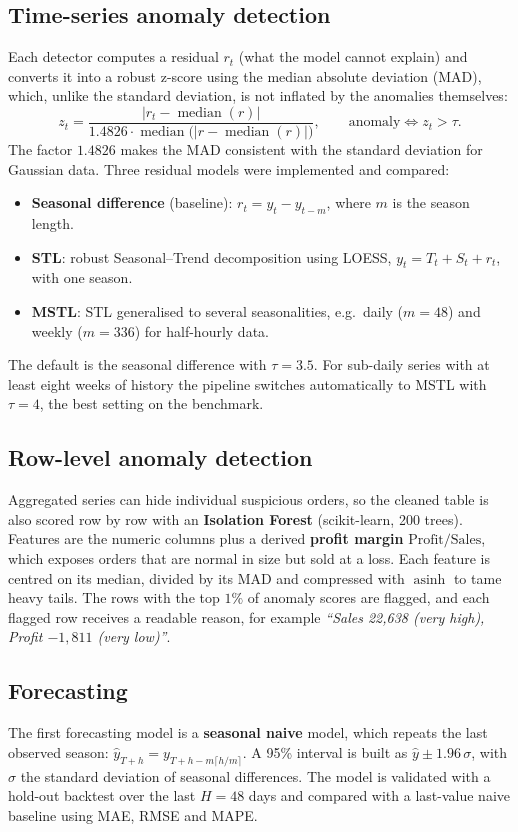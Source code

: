 \documentclass[11pt,a4paper]{article}
\begin{document}
\subsection{Time-series anomaly detection}
Each detector computes a residual $r_t$ (what the model cannot explain) and converts it into a robust z-score
using the median absolute deviation (MAD), which, unlike the standard deviation, is not inflated by the
anomalies themselves:
\[
  z_t = \frac{\lvert r_t - \operatorname{median}(r) \rvert}{1.4826\cdot \operatorname{median}\bigl(\lvert r - \operatorname{median}(r)\rvert\bigr)},
  \qquad \text{anomaly} \iff z_t > \tau .
\]
The factor $1.4826$ makes the MAD consistent with the standard deviation for Gaussian data. Three residual
models were implemented and compared:
\begin{itemize}
  \item \textbf{Seasonal difference} (baseline): $r_t = y_t - y_{t-m}$, where $m$ is the season length.
  \item \textbf{STL}: robust Seasonal--Trend decomposition using LOESS, $y_t = T_t + S_t + r_t$, with one season.
  \item \textbf{MSTL}: STL generalised to several seasonalities, e.g.\ daily ($m=48$) and weekly ($m=336$) for
        half-hourly data.
\end{itemize}
The default is the seasonal difference with $\tau = 3.5$. For sub-daily series with at least eight weeks of
history the pipeline switches automatically to MSTL with $\tau = 4$, the best setting on the benchmark.

\subsection{Row-level anomaly detection}
Aggregated series can hide individual suspicious orders, so the cleaned table is also scored row by row with an
\textbf{Isolation Forest} (scikit-learn, 200 trees). Features are the numeric columns plus a derived
\textbf{profit margin} $\text{Profit}/\text{Sales}$, which exposes orders that are normal in size but sold at a
loss. Each feature is centred on its median, divided by its MAD and compressed with $\operatorname{asinh}$ to tame
heavy tails. The rows with the top $1\%$ of anomaly scores are flagged, and each flagged row receives a readable
reason, for example \emph{``Sales 22{,}638 (very high), Profit $-1{,}811$ (very low)''}.

\subsection{Forecasting}
The first forecasting model is a \textbf{seasonal naive} model, which repeats the last observed season:
$\hat y_{T+h} = y_{T+h-m\lceil h/m\rceil}$. A 95\% interval is built as $\hat y \pm 1.96\,\sigma$, with $\sigma$
the standard deviation of seasonal differences. The model is validated with a hold-out backtest over the last
$H=48$ days and compared with a last-value naive baseline using MAE, RMSE and MAPE.
\end{document}
